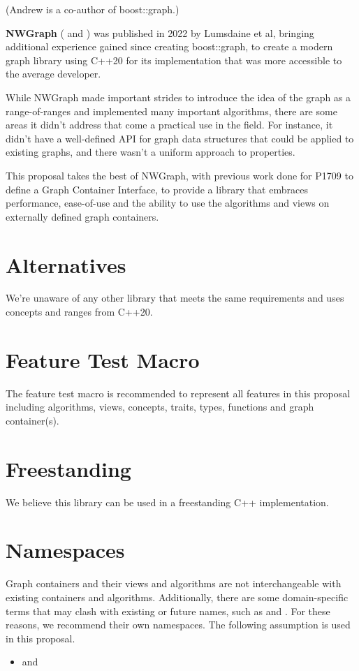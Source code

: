 (Andrew is a co-author of boost::graph.)

\medskip

\textbf{NWGraph} (\cite{REF_nwgraph_library} and \cite{REF_nwgraph_paper}) was published in 2022
by Lumsdaine et al, bringing additional experience gained since creating boost::graph, to create a modern graph library using C++20 for its implementation 
that was more accessible to the average developer. %

While NWGraph made important strides to introduce the idea of the graph as a range-of-ranges and implemented many important algorithms,
there are some areas it didn't address that come a practical use in the field. For instance, it didn't have a well-defined API for graph
data structures that could be applied to existing graphs, and there wasn't a uniform approach to properties.

This proposal takes the best of NWGraph, with previous work done for P1709 to define a Graph Container Interface, to provide a library that
embraces performance, ease-of-use and the ability to use the algorithms and views on externally defined graph containers.

\section{Alternatives}
We're unaware of any other library that meets the same requirements and uses concepts and ranges from C++20.


\section{Feature Test Macro}
The  feature test macro is recommended to represent all features in this proposal including algorithms, views, concepts, traits, types, functions and graph container(s).

\section{Freestanding}
We believe this library can be used in a freestanding C++ implementation.

\section{Namespaces}
Graph containers and their views and algorithms are not interchangeable with existing containers and algorithms.
Additionally, there are some domain-specific terms that may clash with existing or future names, such as 
 and .
For these reasons, we recommend their own namespaces. The following assumption is used in this proposal.
\begin{itemize}
\item[] and 
\end{itemize}

